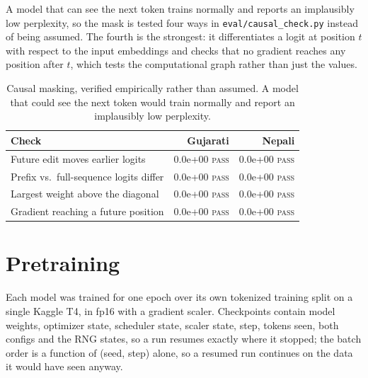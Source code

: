 \documentclass[11pt,a4paper]{article}
\begin{document}
A model that can see the next token trains normally and reports an implausibly
low perplexity, so the mask is tested four ways in
\texttt{eval/causal\_check.py} instead of being assumed. The fourth is the
strongest: it differentiates a logit at position $t$ with respect to the input
embeddings and checks that no gradient reaches any position after $t$, which
tests the computational graph rather than just the values.


\begin{table}[H]
\centering
\small
\begin{tabular}{lrr}
\toprule
\textbf{Check} & \textbf{Gujarati} & \textbf{Nepali} \\
\midrule
Future edit moves earlier logits & 0.0e+00 \textsc{pass} & 0.0e+00 \textsc{pass} \\
Prefix vs.\ full-sequence logits differ & 0.0e+00 \textsc{pass} & 0.0e+00 \textsc{pass} \\
Largest weight above the diagonal & 0.0e+00 \textsc{pass} & 0.0e+00 \textsc{pass} \\
Gradient reaching a future position & 0.0e+00 \textsc{pass} & 0.0e+00 \textsc{pass} \\
\bottomrule
\end{tabular}
\caption{Causal masking, verified empirically rather than assumed. A model that could see the next token would train normally and report an implausibly low perplexity.}
\label{tab:causal}
\end{table}


\section{Pretraining}


Each model was trained for one epoch over its own tokenized training split on a
single Kaggle T4, in fp16 with a gradient scaler. Checkpoints contain model
weights, optimizer state, scheduler state, scaler state, step, tokens seen, both
configs and the RNG states, so a run resumes exactly where it stopped; the batch
order is a function of (seed, step) alone, so a resumed run continues on the data
it would have seen anyway.
\end{document}
